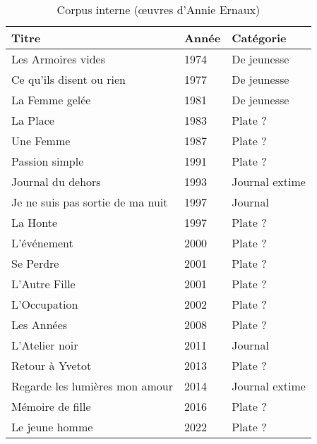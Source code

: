 \begin{table}[h!]
\centering
\begin{tabular}{|l|l|l|}
\hline
\textbf{Titre}                       & \textbf{Année} & \textbf{Catégorie}     \\ \hline
Les Armoires vides                   & 1974           & De jeunesse            \\ \hline
Ce qu'ils disent ou rien             & 1977           & De jeunesse            \\ \hline
La Femme gelée                       & 1981           & De jeunesse            \\ \hline
La Place                             & 1983           & Plate ?                \\ \hline
Une Femme                            & 1987           & Plate ?                \\ \hline
Passion simple                       & 1991           & Plate ?                \\ \hline
Journal du dehors                    & 1993           & Journal extime         \\ \hline
Je ne suis pas sortie de ma nuit     & 1997           & Journal                \\ \hline
La Honte                             & 1997           & Plate ?                \\ \hline
L'événement                          & 2000           & Plate ?                \\ \hline
Se Perdre                            & 2001           & Plate ?                \\ \hline
L'Autre Fille                        & 2001           & Plate ?                \\ \hline
L'Occupation                         & 2002           & Plate ?                \\ \hline
Les Années                           & 2008           & Plate ?                \\ \hline
L'Atelier noir                       & 2011           & Journal                \\ \hline
Retour à Yvetot                      & 2013           & Plate ?                \\ \hline
Regarde les lumières mon amour       & 2014           & Journal extime         \\ \hline
Mémoire de fille                     & 2016           & Plate ?                \\ \hline
Le jeune homme                       & 2022           & Plate ?                \\ \hline
\end{tabular}
\caption{Corpus interne (œuvres d'Annie Ernaux)}
\label{table:corpus_interne}
\end{table}

